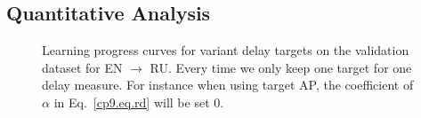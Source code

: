 \subsection{Quantitative Analysis}
\begin{figure}[hptb]
\centering
{}

\caption{{Learning progress curves for variant delay targets on the validation dataset for EN $\rightarrow$ RU. Every time we only keep one target for one delay measure. For instance when using target AP, the coefficient of $\alpha$ in Eq.~\eqref{cp9.eq.rd} will be set $0$.}}
\label{cp9.fig.lr}

\end{figure}

